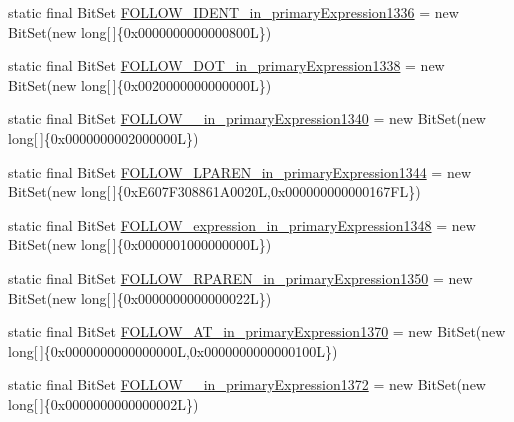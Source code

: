 \begin{DoxyCompactItemize}
\item 
static final Bit\-Set \hyperlink{classorg_1_1tzi_1_1use_1_1parser_1_1ocl_1_1_o_c_l_parser_a7f2d3037f96b8455381b053737df7e15}{F\-O\-L\-L\-O\-W\-\_\-\-I\-D\-E\-N\-T\-\_\-in\-\_\-primary\-Expression1336} = new Bit\-Set(new long\mbox{[}$\,$\mbox{]}\{0x0000000000000800\-L\})
\item 
static final Bit\-Set \hyperlink{classorg_1_1tzi_1_1use_1_1parser_1_1ocl_1_1_o_c_l_parser_a5182c4833e0e7140238f9786ffda488e}{F\-O\-L\-L\-O\-W\-\_\-\-D\-O\-T\-\_\-in\-\_\-primary\-Expression1338} = new Bit\-Set(new long\mbox{[}$\,$\mbox{]}\{0x0020000000000000\-L\})
\item 
static final Bit\-Set \hyperlink{classorg_1_1tzi_1_1use_1_1parser_1_1ocl_1_1_o_c_l_parser_a41a9bb2ce23e0b5104e45f5b020bbe40}{F\-O\-L\-L\-O\-W\-\_\-\_\-in\-\_\-primary\-Expression1340} = new Bit\-Set(new long\mbox{[}$\,$\mbox{]}\{0x0000000002000000\-L\})
\item 
static final Bit\-Set \hyperlink{classorg_1_1tzi_1_1use_1_1parser_1_1ocl_1_1_o_c_l_parser_afc21f4398e0fbdcb114faa509534c612}{F\-O\-L\-L\-O\-W\-\_\-\-L\-P\-A\-R\-E\-N\-\_\-in\-\_\-primary\-Expression1344} = new Bit\-Set(new long\mbox{[}$\,$\mbox{]}\{0x\-E607\-F308861\-A0020\-L,0x000000000000167\-F\-L\})
\item 
static final Bit\-Set \hyperlink{classorg_1_1tzi_1_1use_1_1parser_1_1ocl_1_1_o_c_l_parser_af661c85f8ad6d0ae8ed3409d0581f537}{F\-O\-L\-L\-O\-W\-\_\-expression\-\_\-in\-\_\-primary\-Expression1348} = new Bit\-Set(new long\mbox{[}$\,$\mbox{]}\{0x0000001000000000\-L\})
\item 
static final Bit\-Set \hyperlink{classorg_1_1tzi_1_1use_1_1parser_1_1ocl_1_1_o_c_l_parser_a0a7ef59c2b33f4ade3e88abf0567b965}{F\-O\-L\-L\-O\-W\-\_\-\-R\-P\-A\-R\-E\-N\-\_\-in\-\_\-primary\-Expression1350} = new Bit\-Set(new long\mbox{[}$\,$\mbox{]}\{0x0000000000000022\-L\})
\item 
static final Bit\-Set \hyperlink{classorg_1_1tzi_1_1use_1_1parser_1_1ocl_1_1_o_c_l_parser_a384f730c32a385787af873afa0cf0690}{F\-O\-L\-L\-O\-W\-\_\-\-A\-T\-\_\-in\-\_\-primary\-Expression1370} = new Bit\-Set(new long\mbox{[}$\,$\mbox{]}\{0x0000000000000000\-L,0x0000000000000100\-L\})
\item 
static final Bit\-Set \hyperlink{classorg_1_1tzi_1_1use_1_1parser_1_1ocl_1_1_o_c_l_parser_a48b1ea36faf3e956b9031f736f2bbcde}{F\-O\-L\-L\-O\-W\-\_\-\_\-in\-\_\-primary\-Expression1372} = new Bit\-Set(new long\mbox{[}$\,$\mbox{]}\{0x0000000000000002\-L\})
\item 

\end{DoxyCompactItemize}

